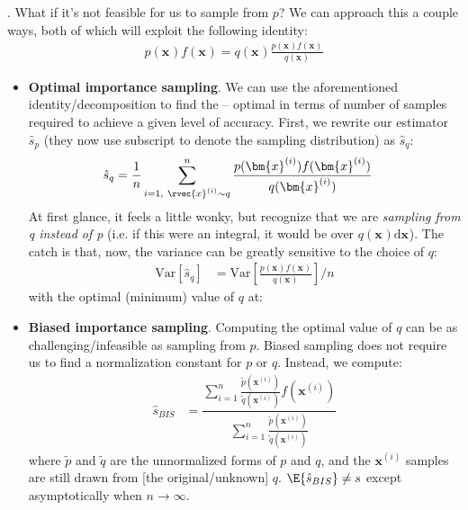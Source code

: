 \documentclass[11pt]{article}
\renewcommand\vec[2][]{\bm{#2}_{#1}}
\newcommand\myspace[1][]{\vspace{#1\bigskipamount}}
\newcommand\p{\Needspace{10\baselineskip} \noindent}
\newcommand\Var[1]{\mathrm{Var}\left[#1\right]}
\begin{document}
\myspace
\p {}. What if it's not feasible for us to sample from $p$? We can approach this a couple ways, both of which will exploit the following identity:
\begin{align}
	p(\vec{x}) f(\vec{x}) = q(\vec{x}) \frac{p(\vec{x}) f(\vec{x})}{q(\vec{x})}
\end{align}
\begin{itemize}
	\item \textbf{Optimal importance sampling}. We can use the aforementioned identity/decomposition to find the  -- optimal in terms of number of samples required to achieve a given level of accuracy. First, we rewrite our estimator $\hat{s}_p$ (they now use subscript to denote the sampling distribution) as $\hat{s}_q$:
	\begin{align}
		\hat{s}_q &=  \frac{1}{n} \sum_{i = 1,~\rvec{x}^{(i)} \sim q}^{n} \frac{p(\vec{x}^{(i)}) f(\vec{x}^{(i)})}{q(\vec{x}^{(i)})}
	\end{align}
	At first glance, it feels a little wonky, but recognize that we are \textit{sampling from q instead of p} (i.e. if this were an integral, it would be over $q(\vec{x})\mathrm{d}\vec{x}$). The catch is that, now, the variance can be greatly sensitive to the choice of $q$:
	\begin{align}
		\Var{\hat{s}_q} &= \Var{\frac{p(\vec{x}) f(\vec{x})}{q(\vec{x})}} / n
	\end{align}
	with the optimal (minimum) value of $q$ at:
	\graybox{
		q* &= \frac{p(\vec{x})\mid f(\vec{x}) \mid}{Z}
		}
		
	\item \textbf{Biased importance sampling}. Computing the optimal value of $q$ can be as challenging/infeasible as sampling from $p$. Biased sampling does not require us to find a normalization constant for $p$ or $q$. Instead, we compute:
	\begin{align}
		\hat{s}_{BIS} &= \dfrac{
			\sum_{i = 1}^{n} \frac{\tilde p(\vec{x}^{(i)})}{\tilde q(\vec{x}^{(i)})}  f(\vec{x}^{(i)})
			}{
			\sum_{i = 1}^{n} \frac{\tilde p(\vec{x}^{(i)})}{\tilde q(\vec{x}^{(i)})}  
			}
	\end{align}
	where $\tilde p$ and $\tilde q$ are the unnormalized forms of $p$ and $q$, and the $\vec{x}^{(i)}$ samples are still drawn from [the original/unknown] $q$. $\E{\hat s_{BIS}} \ne s$ except asymptotically when $n \rightarrow \infty$. 
\end{itemize}
\end{document}
